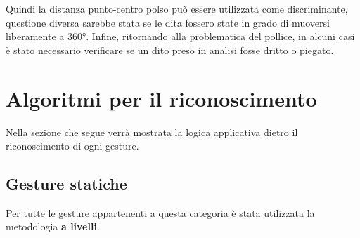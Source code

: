 \begin{multicols}{2}
\begin{multicolfigure}
    \end{multicolfigure} 
\end{multicols}
\vspace{+ 15 px}
  
\noindent Quindi la distanza punto-centro polso può essere utilizzata come discriminante, questione diversa sarebbe stata se le dita fossero state in grado di muoversi liberamente a 360°. Infine, ritornando alla problematica del pollice, in alcuni casi è stato necessario verificare se un dito preso in analisi fosse dritto o piegato.\\

\newpage
\section{Algoritmi per il riconoscimento}
Nella sezione che segue verrà mostrata la logica applicativa dietro il riconoscimento di ogni gesture.

\subsection{Gesture statiche}
Per tutte le gesture appartenenti a questa categoria è stata utilizzata la metodologia \textbf{a livelli}.
